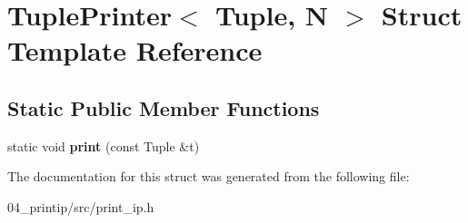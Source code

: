\hypertarget{structTuplePrinter}{}\section{Tuple\+Printer$<$ Tuple, N $>$ Struct Template Reference}
\label{structTuplePrinter}
\subsection*{Static Public Member Functions}
\begin{DoxyCompactItemize}
\item 
\mbox{\label{structTuplePrinter_aaf76573f278205ba63759d5dbe3f408c}} 
static void {\bfseries print} (const Tuple \&t)
\end{DoxyCompactItemize}


The documentation for this struct was generated from the following file\+:\begin{DoxyCompactItemize}
\item 
04\+\_\+printip/src/print\+\_\+ip.\+h\end{DoxyCompactItemize}
